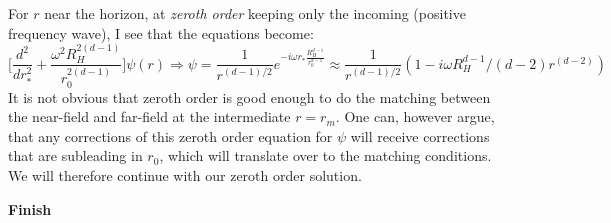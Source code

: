 \documentclass[11pt, class=article, crop=false]{standalone}
\begin{document}
\begin{enumerate}
	
	For $r$ near the horizon, at \emph{zeroth order} keeping only the incoming (positive frequency wave), I see that the equations become:
	\[
		\Big[ \frac{d^2}{dr_*^2} +  \frac{\omega^2 R_H^{2 (d-1)}}{r_0^{2(d-1)}}  \Big] \psi(r) \Rightarrow \psi = \frac{1}{r^{(d-1)/2}} e^{-i \omega r_* \frac{R_H^{d-1}}{r_0^{d-1}}}  \approx \frac{1}{r^{(d-1)/2}} (1 - i \omega R_H^{d-1} / (d-2) r^{(d-2)} )
	\]
	It is not obvious that zeroth order is good enough to do the matching between the near-field and far-field at the intermediate $r = r_m$. One can, however argue, that any corrections of this zeroth order equation for $\psi$ will receive corrections that are subleading in $r_0$, which will translate over to the matching conditions. We will therefore continue with our zeroth order solution.

	\textbf{Finish}

	

	

\end{enumerate}
\end{document}
